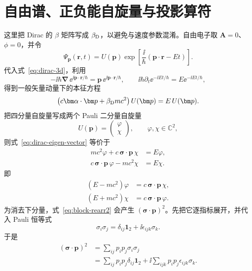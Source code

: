 \section{自由谱、正负能自旋量与投影算符}

这里把 Dirac 的 $\beta$ 矩阵写成 $\beta_{\rm D}$，以避免与速度参数混淆。自由电子取 $\bm A=0$、$\phi=0$，并令
\begin{equation}
 \Psi_{\bm p}(\bm r,t)
 =U(\bm p)\exp\!\left[\frac{\ii}{\hbar}(\bm p\cdot\bm r-Et)\right].
 \label{eq:dirac-plane-wave-vector}
\end{equation}
代入式~\eqref{eq:dirac-3d}，利用
\[
 -\ii\hbar\bm\nabla\,
 \ee^{\ii\bm p\cdot\bm r/\hbar}
 =\bm p\,\ee^{\ii\bm p\cdot\bm r/\hbar},
 \qquad
 \ii\hbar\partial_t\ee^{-\ii Et/\hbar}
 =E\ee^{-\ii Et/\hbar},
\]
得到一般矢量动量下的本征方程
\begin{equation}
 \left(c\bm\alpha\cdot\bm p+\beta_{\rm D}mc^2\right)U(\bm p)
 =E\,U(\bm p).
 \label{eq:dirac-eigen-vector}
\end{equation}
把四分量自旋量写成两个 Pauli 二分量自旋量
\begin{equation}
 U(\bm p)=
 \begin{pmatrix}\varphi\\ \chi\end{pmatrix},
 \qquad \varphi,\chi\in\mathbb C^2,
\end{equation}
则式~\eqref{eq:dirac-eigen-vector} 等价于
\begin{align}
 mc^2\varphi+c\,\bm\sigma\cdot\bm p\,\chi&=E\varphi,
 \label{eq:dirac-block1}\\
 c\,\bm\sigma\cdot\bm p\,\varphi-mc^2\chi&=E\chi.
 \label{eq:dirac-block2}
\end{align}
即
\begin{align}
 (E-mc^2)\varphi&=c\,\bm\sigma\cdot\bm p\,\chi,
 \label{eq:block-rearr1}\\
 (E+mc^2)\chi&=c\,\bm\sigma\cdot\bm p\,\varphi.
 \label{eq:block-rearr2}
\end{align}
为消去下分量，式~\eqref{eq:block-rearr2} 会产生 $(\bm\sigma\cdot\bm p)^2$。先把它逐指标展开，并代入 Pauli 恒等式
\begin{equation}
 \sigma_i\sigma_j=\delta_{ij}\mathbf 1_2+\ii\epsilon_{ijk}\sigma_k.
\end{equation}
于是
\begin{align}
 (\bm\sigma\cdot\bm p)^2
 &=\sum_{ij}p_ip_j\sigma_i\sigma_j\\
 &=\sum_{ij}p_ip_j\delta_{ij}\mathbf 1_2
 +\ii\sum_{ijk}p_ip_j\epsilon_{ijk}\sigma_k.
\end{align}
